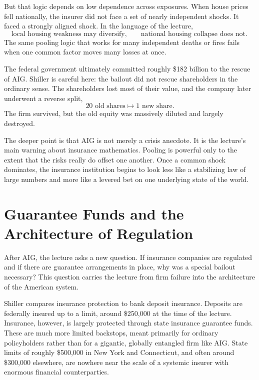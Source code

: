 But that logic depends on low dependence across exposures. When house prices fell nationally, the insurer did not face a set of nearly independent shocks. It faced a strongly aligned shock. In the language of the lecture,
\begin{equation}
\text{local housing weakness may diversify}, \qquad \text{national housing collapse does not.}
\end{equation}
The same pooling logic that works for many independent deaths or fires fails when one common factor moves many losses at once.

The federal government ultimately committed roughly \$182 billion to the rescue of AIG. Shiller is careful here: the bailout did not rescue shareholders in the ordinary sense. The shareholders lost most of their value, and the company later underwent a reverse split,
\begin{equation}
20 \text{ old shares} \mapsto 1 \text{ new share}.
\end{equation}
The firm survived, but the old equity was massively diluted and largely destroyed.

The deeper point is that AIG is not merely a crisis anecdote. It is the lecture's main warning about insurance mathematics. Pooling is powerful only to the extent that the risks really do offset one another. Once a common shock dominates, the insurance institution begins to look less like a stabilizing law of large numbers and more like a levered bet on one underlying state of the world.

\section{Guarantee Funds and the Architecture of Regulation}

After AIG, the lecture asks a new question. If insurance companies are regulated and if there are guarantee arrangements in place, why was a special bailout necessary? This question carries the lecture from firm failure into the architecture of the American system.

Shiller compares insurance protection to bank deposit insurance. Deposits are federally insured up to a limit, around \$250{,}000 at the time of the lecture. Insurance, however, is largely protected through state insurance guarantee funds. These are much more limited backstops, meant primarily for ordinary policyholders rather than for a gigantic, globally entangled firm like AIG. State limits of roughly \$500{,}000 in New York and Connecticut, and often around \$300{,}000 elsewhere, are nowhere near the scale of a systemic insurer with enormous financial counterparties.

